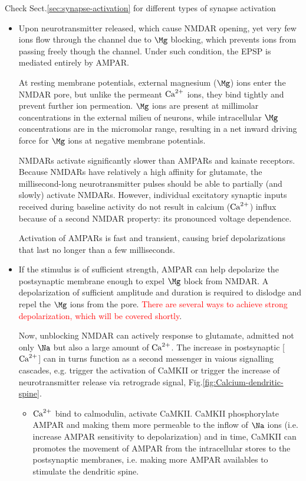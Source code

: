 Check Sect.\ref{sec:synapse-activation} for different types of synapse
activation
\begin{itemize}
  
  \item Upon neurotransmitter released, which cause NMDAR opening, yet very few
  ions flow through the channel due to $\Mg$ blocking, which prevents ions from
  passing freely though the channel. Under such condition, the EPSP is mediated
  entirely by AMPAR.

At resting membrane potentials, external magnesium ($\Mg$) ions enter the NMDAR
pore, but unlike the permeant ${\text{Ca}^{2+}}$ ions, they bind tightly and prevent further
ion permeation. $\Mg$ ions are present at millimolar concentrations in the
external milieu of neurons, while intracellular $\Mg$ concentrations are in the
micromolar range, resulting in a net inward driving force for $\Mg$ ions at
negative membrane potentials.

NMDARs activate significantly slower than AMPARs and kainate
receptors. Because NMDARs have relatively a high affinity for glutamate, the
millisecond-long neurotransmitter pulses should be able to partially (and
slowly) activate NMDARs. However, individual excitatory synaptic inputs received
during baseline activity do not result in calcium (${\text{Ca}^{2+}}$) influx because of a
second NMDAR property: its pronounced voltage dependence.

Activation of AMPARs is fast and transient, causing brief depolarizations that
last no longer than a few milliseconds.

  \item If the stimulus is of sufficient strength, AMPAR can help depolarize the
  postsynaptic membrane enough to expel $\Mg$ block from NMDAR.
  A depolarization of sufficient amplitude and duration is required to dislodge
  and repel the $\Mg$ ions from the pore. \textcolor{red}{There are several
  ways to achieve strong depolarization, which will be covered shortly}.
  
Now, unblocking NMDAR can actively response to glutamate, admitted not only
$\Na$ but also a large amount of ${\text{Ca}^{2+}}$.
The increase in postsynaptic [${\text{Ca}^{2+}}$] can in turns function as a second messenger
in vaious signalling cascades, e.g. trigger the activation of CaMKII or trigger
the increase of neurotransmitter release via retrograde signal,
Fig.\ref{fig:Calcium-dendritic-spine}.
\begin{itemize}
  
  \item ${\text{Ca}^{2+}}$ bind to calmodulin, activate CaMKII. CaMKII phosphorylate AMPAR
  and making them more permeable to the inflow of $\Na$ ions (i.e. increase
  AMPAR sensitivity to depolarization) and in time, CaMKII can promotes the
  movement of AMPAR from the intracellular stores to the postsynaptic membranes,
  i.e. making more AMPAR availables to stimulate the dendritic spine.


\end{itemize}
\end{itemize}
